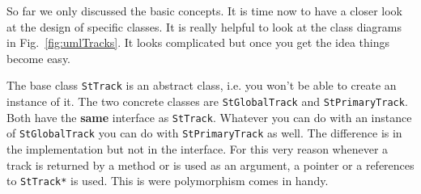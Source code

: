 \documentclass[twoside]{article}
\begin{document}
So far we only discussed the basic concepts. It is time now to have a
closer look at the design of specific classes. It is really helpful to
look at the class diagrams in Fig.~\ref{fig:umlTracks}. It looks
complicated but once you get the idea things become easy.

The base class \texttt{StTrack} is an abstract class, i.e. you won't
be able to create an instance of it. The two concrete classes are
\texttt{StGlobalTrack} and \texttt{StPrimaryTrack}.  Both have the
\textbf{same} interface as \texttt{StTrack}. Whatever you can do with
an instance of \texttt{StGlobalTrack} you can do with
\texttt{StPrimaryTrack} as well. The difference is in the
implementation but not in the interface. For this very reason whenever
a track is returned by a method or is used as an argument, a pointer
or a references to \texttt{StTrack*} is used. This is were
polymorphism comes in handy.
\end{document}
